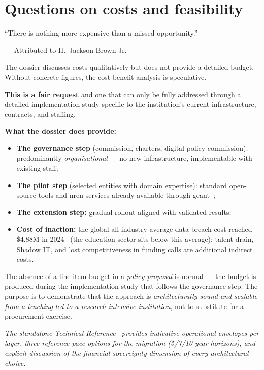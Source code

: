 \section{Questions on costs and feasibility}
\label{sec:q-costs}

\epigraph{``There is nothing more expensive than a missed opportunity.''}{--- Attributed to H.\ Jackson Brown Jr.}

\begin{questionbox}
The dossier discusses costs qualitatively but does not provide a detailed budget. Without concrete figures, the cost-benefit analysis is speculative.
\end{questionbox}

\begin{answerbox}[Answer to Q9.1]
\textbf{This is a fair request} and one that can only be fully addressed through a detailed implementation study specific to the institution's current infrastructure, contracts, and staffing.

\medskip\noindent\textbf{What the dossier does provide:}
\begin{itemize}[nosep]
    \item \textbf{The governance step} (commission, charters, digital-policy commission): predominantly \emph{organisational} --- no new infrastructure, implementable with existing staff;
    \item \textbf{The pilot step} (selected entities with domain expertise): standard open-source tools and \gls{nren} services already available through \gls{geant}~\cite{geant};
    \item \textbf{The extension step:} gradual rollout aligned with validated results;
    \item \textbf{Cost of inaction:} the global all-industry average data-breach cost reached \$4.88M in 2024~\cite{ibm-cost-breach-2024} (the education sector sits below this average); talent drain, Shadow IT, and lost competitiveness in funding calls are additional indirect costs.
\end{itemize}

\noindent The absence of a line-item budget in a \emph{policy proposal} is normal --- the budget is produced during the implementation study that follows the governance step. The purpose is to demonstrate that the approach is \emph{architecturally sound and scalable from a teaching-led to a research-intensive institution}, not to substitute for a procurement exercise.

\smallskip\noindent\textit{\footnotesize The standalone Technical Reference~\cite{ng-tech-ref-2026} provides indicative operational envelopes per layer, three reference pace options for the migration (5/7/10-year horizons), and explicit discussion of the financial-sovereignty dimension of every architectural choice.}
\end{answerbox}

